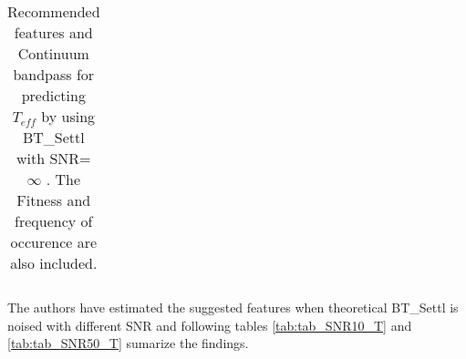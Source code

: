 \begin{table}
\begin{center}
\begin{tabular}{rrrrrrr}
   \hline
\end{tabular}
\caption {Recommended features and Continuum bandpass for predicting $ T_{eff} $ 
      by using BT\_Settl with SNR= $ {\infty} $ . 
      The Fitness and frequency of occurence are also included.} \label{tab:tab_NC_T} 
\end{center}
\end{table}

The authors have estimated the suggested features when theoretical BT\_Settl 
is noised with different SNR and following tables \ref{tab:tab_SNR10_T} 
and \ref{tab:tab_SNR50_T} sumarize the findings.


